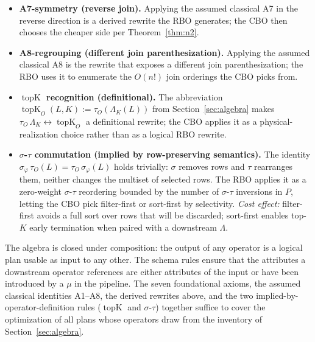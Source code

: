 \documentclass[sigconf,nonacm,review]{acmart}
\theoremstyle{plain}
\theoremstyle{definition}
\newcommand{\topK}{\operatorname{topK}}
\theoremstyle{remark}
\begin{document}
\begin{itemize}[leftmargin=*]
\begin{align*}
      &= \mu_{\lVert V-q\rVert\to d}\;
         \sigma_{\lVert V-q\rVert<\tau}\;(L \bowtie M)
         \quad\text{(M1)} \\
      &= \mu_{\lVert V-q\rVert\to d}\;
         \bigl(\sigma_{\lVert V-q\rVert<\tau}(L) \bowtie M\bigr)
         \quad\text{(A4-vector)}
    \end{align*}
    The plan now computes the distance only on the surviving
    $L$ rows. Same cost effect as M4+M1, but with the vector
    selection specifically.
  \item \textbf{A7-symmetry (reverse join).} Applying the assumed
    classical A7 in the reverse direction is a derived rewrite the
    RBO generates; the CBO then chooses the cheaper side per
    Theorem~\ref{thm:n2}.
  \item \textbf{A8-regrouping (different join parenthesization).}
    Applying the assumed classical A8 is the rewrite that exposes
    a different join parenthesization; the RBO uses it to
    enumerate the $O(n!)$ join orderings the CBO picks from.
  \item \textbf{$\topK$ recognition (definitional).} The
    abbreviation $\topK_O(L, K) := \tau_O(\Lambda_K(L))$ from
    Section~\ref{sec:algebra} makes
    $\tau_O\,\Lambda_K \leftrightarrow \topK_O$ a definitional
    rewrite; the CBO applies it as a physical-realization choice
    rather than as a logical RBO rewrite.
  \item \textbf{$\sigma$-$\tau$ commutation (implied by
    row-preserving semantics).} The identity
    $\sigma_\varphi\, \tau_O(L) = \tau_O\, \sigma_\varphi(L)$ holds
    trivially: $\sigma$ removes rows and $\tau$ rearranges them,
    neither changes the multiset of selected rows. The RBO applies
    it as a zero-weight $\sigma$-$\tau$ reordering bounded by the
    number of $\sigma$-$\tau$ inversions in $P$, letting the CBO
    pick filter-first or sort-first by selectivity.
    \emph{Cost effect:} filter-first avoids a full sort over
    rows that will be discarded; sort-first enables top-$K$
    early termination when paired with a downstream $\Lambda$.
\end{itemize}

The algebra is closed under composition: the output of any operator
is a logical plan usable as input to any other. The schema rules
ensure that the attributes a downstream operator references are
either attributes of the input or have been introduced by a $\mu$ in
the pipeline. The seven foundational axioms, the assumed classical
identities A1--A8, the derived rewrites above, and the two
implied-by-operator-definition rules ($\topK$ and $\sigma$-$\tau$)
together suffice to cover the optimization of all plans whose
operators draw from the inventory of
Section~\ref{sec:algebra}.
\end{document}
